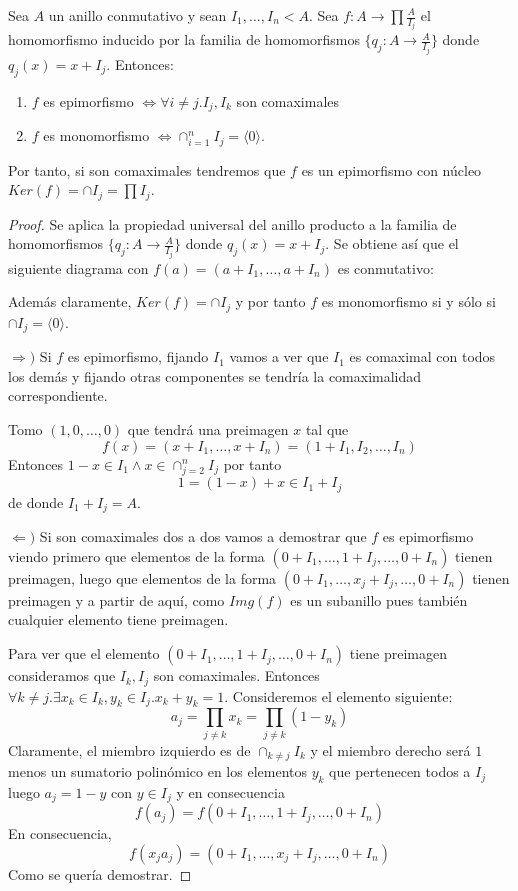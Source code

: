 \begin{theorem}
Sea $A$ un anillo conmutativo y sean $I_1,\ldots,I_n < A$. Sea $f:A \to \prod \frac{A}{I_j}$ el homomorfismo inducido por la familia de homomorfismos $\{q_j:A \to \frac{A}{I_j}\}$ donde $q_j(x) = x+I_j$. Entonces:

\begin{enumerate}
\item $f$ es epimorfismo $\iff \forall i \neq j. I_j,I_k$ son comaximales
\item $f$ es monomorfismo $\iff \cap_{i = 1}^n I_j = \langle 0 \rangle$. 
\end{enumerate}

Por tanto, si son comaximales tendremos que $f$ es un epimorfismo con núcleo $Ker(f) = \cap I_j = \prod I_j$. 
\end{theorem}
\begin{proof}
Se aplica la propiedad universal del anillo producto a la familia de homomorfismos $\{q_j:A \to \frac{A}{I_j}\}$ donde $q_j(x) = x+I_j$. Se obtiene así que el siguiente diagrama con $f(a) = (a+I_1,\ldots,a+I_n)$ es conmutativo:


Además claramente, $Ker(f) = \cap I_j$ y por tanto $f$ es monomorfismo si y sólo si $\cap I_j = \langle 0 \rangle$. 

$\Rightarrow)$ Si $f$ es epimorfismo, fijando $I_1$ vamos a ver que $I_1$ es comaximal con todos los demás y fijando otras componentes se tendría la comaximalidad correspondiente. 

Tomo $(1,0,\ldots,0)$ que tendrá una preimagen $x$ tal que $$f(x) = (x+I_1,\ldots,x+I_n) = (1+I_1,I_2,\ldots,I_n)$$ Entonces $1-x \in I_1 \land x \in \cap_{j = 2}^n I_j$ por tanto $$1 = (1-x)+x \in I_1 + I_j$$ de donde $I_1 + I_j = A$. 

$\Leftarrow)$ Si son comaximales dos a dos vamos a demostrar que $f$ es epimorfismo viendo primero que elementos de la forma $(0+I_1,\ldots,1+I_j,\ldots,0+I_n)$ tienen preimagen, luego que elementos de la forma $(0+I_1,\ldots,x_j+I_j,\ldots,0+I_n)$ tienen preimagen y a partir de aquí, como $Img(f)$ es un subanillo pues también cualquier elemento tiene preimagen. 

Para ver que el elemento $(0+I_1,\ldots,1+I_j,\ldots,0+I_n)$ tiene preimagen consideramos que $I_k,I_j$ son comaximales. Entonces $\forall k \neq j. \exists x_k \in I_k,y_k \in I_j. x_k+y_k = 1$. Consideremos el elemento siguiente: $$a_j =  \prod_{j \neq k} x_k = \prod_{j \neq k} (1-y_k)$$ Claramente, el miembro izquierdo es de $\cap_{k \neq j} I_k$ y el miembro derecho será $1$ menos un sumatorio polinómico en los elementos $y_k$ que pertenecen todos a $I_j$ luego $a_j = 1-y$ con $y \in I_j$ y en consecuencia $$f(a_j) = f(0+I_1,\ldots,1+I_j,\ldots, 0+I_n)$$ En consecuencia, $$f(x_ja_j) = (0+I_1,\ldots,x_j+I_j,\ldots,0+I_n)$$ Como se quería demostrar.

\end{proof}















